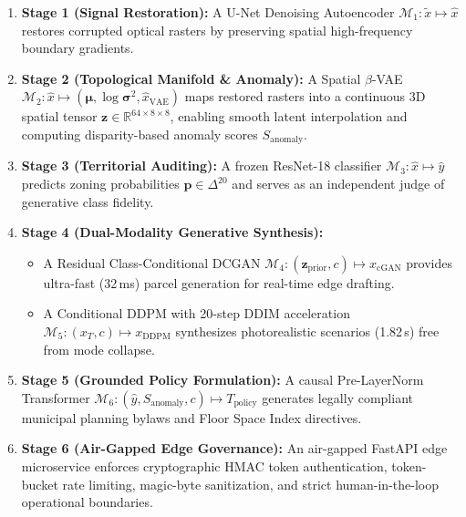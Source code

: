 \documentclass[journal]{IEEEtran}
\begin{document}
\begin{enumerate}
    \item \textbf{Stage 1 (Signal Restoration):} A U-Net Denoising Autoencoder $\mathcal{M}_1: \tilde{x} \mapsto \hat{x}$ restores corrupted optical rasters by preserving spatial high-frequency boundary gradients.
    \item \textbf{Stage 2 (Topological Manifold & Anomaly):} A Spatial $\beta$-VAE $\mathcal{M}_2: \hat{x} \mapsto (\bm{\mu}, \log\bm{\sigma}^2, \hat{x}_{\text{VAE}})$ maps restored rasters into a continuous 3D spatial tensor $\mathbf{z} \in \mathbb{R}^{64 \times 8 \times 8}$, enabling smooth latent interpolation and computing disparity-based anomaly scores $S_{\text{anomaly}}$.
    \item \textbf{Stage 3 (Territorial Auditing):} A frozen ResNet-18 classifier $\mathcal{M}_3: \hat{x} \mapsto \hat{y}$ predicts zoning probabilities $\mathbf{p} \in \Delta^{20}$ and serves as an independent judge of generative class fidelity.
    \item \textbf{Stage 4 (Dual-Modality Generative Synthesis):} 
    \begin{itemize}
        \item A Residual Class-Conditional DCGAN $\mathcal{M}_4: (\mathbf{z}_{\text{prior}}, c) \mapsto x_{\text{cGAN}}$ provides ultra-fast (32\,ms) parcel generation for real-time edge drafting.
        \item A Conditional DDPM with 20-step DDIM acceleration $\mathcal{M}_5: (x_T, c) \mapsto x_{\text{DDPM}}$ synthesizes photorealistic scenarios (1.82\,s) free from mode collapse.
    \end{itemize}
    \item \textbf{Stage 5 (Grounded Policy Formulation):} A causal Pre-LayerNorm Transformer $\mathcal{M}_6: (\hat{y}, S_{\text{anomaly}}, c) \mapsto T_{\text{policy}}$ generates legally compliant municipal planning bylaws and Floor Space Index directives.
    \item \textbf{Stage 6 (Air-Gapped Edge Governance):} An air-gapped FastAPI edge microservice enforces cryptographic HMAC token authentication, token-bucket rate limiting, magic-byte sanitization, and strict human-in-the-loop operational boundaries.
\end{enumerate}
\end{document}
